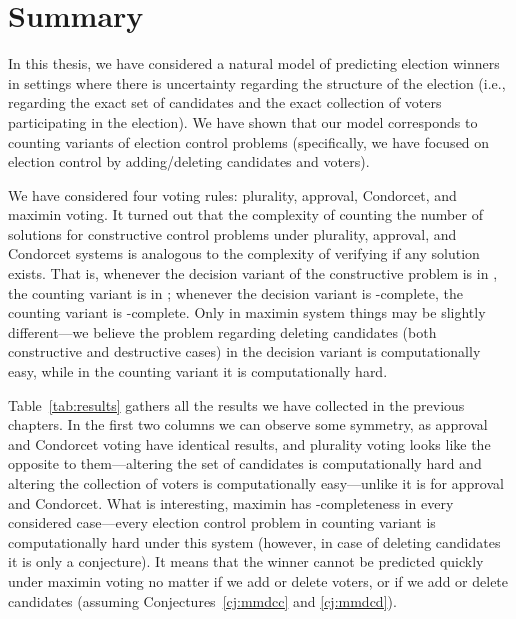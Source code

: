 \chapter{Summary} \label{ch:summary}

In this thesis, we have considered a natural model of predicting election winners in settings where there is uncertainty regarding the structure of the election (i.e., regarding the exact set of candidates and the exact collection of voters participating in the election).
We have shown that our model corresponds to counting variants of election control problems (specifically, we have focused on election control by adding/deleting candidates and voters).

We have considered four voting rules: plurality, approval, Condorcet, and maximin voting.
It turned out that the complexity of counting the number of solutions for constructive control problems under plurality, approval, and Condorcet systems is analogous to the complexity of verifying if any solution exists.
That is, whenever the decision va\-riant of the constructive problem is in \Pclass, the counting variant is in \FPclass; whenever the decision variant is \NPclass-complete, the counting variant is \sharpPclass-complete.
Only in ma\-xi\-min system things may be slightly different---we believe the problem regarding deleting candidates (both constructive and destructive cases) in the decision variant is computationally easy, while in the counting variant it is computationally hard.

Table~\ref{tab:results} gathers all the results we have collected in the previous chapters.
In the first two columns we can observe some symmetry, as approval and Condorcet voting have identical results, and plurality voting looks like the opposite to them---altering the set of candidates is computationally hard and altering the collection of voters is computationally easy---unlike it is for approval and Condorcet.
What is interesting, maximin has \sharpPclass-completeness in every considered case---every election control problem in counting variant is computationally hard under this system (however, in case of deleting candidates it is only a conjecture).
It means that the winner cannot be predicted quickly under maximin voting no matter if we add or delete voters, or if we add or delete candidates (assuming Conjectures~\ref{cj:mmdcc} and \ref{cj:mmdcd}).


